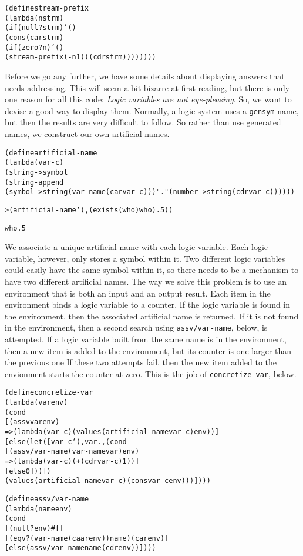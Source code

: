 \begin{alltt}
(define stream-prefix
  (lambda (n strm)
    (if (null? strm) '()
      (cons (car strm)
        (if (zero? n) '()
          (stream-prefix (- n 1) ((cdr strm))))))))
\end{alltt}

Before we go any further, we have some details about displaying
answers that needs addressing.  This will seem a bit bizarre at first
reading, but there is only one reason for all this code: \emph{Logic
variables are not eye-pleasing}.  So, we want to devise a good way to
display them.  Normally, a logic system uses a \texttt{gensym} name,
but then the results are very difficult to follow.  So rather than use
generated names, we construct our own artificial names.

\begin{alltt}
(define artificial-name
  (lambda (var-c)
    (string->symbol
      (string-append
        (symbol->string (var-name (car var-c))) "." (number->string (cdr var-c))))))

> (artificial-name `(,(exists (who) who) . 5))

who.5
\end{alltt}
We associate a unique artificial name with each logic variable.  Each
logic variable, however, only stores a symbol within it.  Two
different logic variables could easily have the same symbol within it,
so there needs to be a mechanism to have two different artificial
names.  The way we solve this problem is to use an environment that is
both an input and an output result.  Each item in the environment
binds a logic variable to a counter.  If the logic variable is found
in the environment, then the associated artificial name is returned.
If it is not found in the environment, then a second search using
\texttt{assv/var-name}, below, is attempted.  If a logic variable built
from the same name is in the environment, then a new item is added to
the environment, but its counter is one larger than the previous one
If these two attempts fail, then the new item added to the envionment
starts the counter at zero.  This is the job of \texttt{concretize-var}, below.
\begin{alltt}
(define concretize-var
  (lambda (var env)
    (cond
      [(assv var env)
       => (lambda (var-c) (values (artificial-name var-c) env))]
      [else (let ([var-c `(,var . ,(cond
                                     [(assv/var-name (var-name var) env)
                                      => (lambda (var-c) (+ (cdr var-c) 1))]
                                     [else 0]))])
              (values (artificial-name var-c) (cons var-c env)))])))
\end{alltt}
\begin{alltt}
(define assv/var-name
  (lambda (name env)
    (cond
      [(null? env) #f]
      [(eqv? (var-name (caar env)) name) (car env)]
      [else (assv/var-name name (cdr env))])))
\end{alltt}

